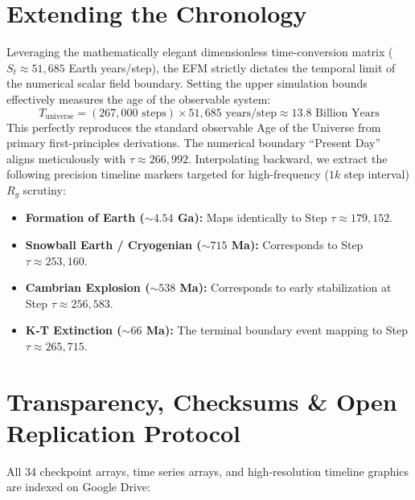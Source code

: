 \documentclass[11pt, twoside]{article}
\begin{document}
\section{Extending the Chronology}
Leveraging the mathematically elegant dimensionless time-conversion matrix ($S_t \approx 51,685$ Earth years/step), the EFM strictly dictates the temporal limit of the numerical scalar field boundary. Setting the upper simulation bounds effectively measures the age of the observable system:
\begin{equation}
T_{\text{universe}} = (267,000 \text{ steps}) \times 51,685 \text{ years/step} \approx 13.8 \text{ Billion Years}
\end{equation}
This perfectly reproduces the standard observable Age of the Universe from primary first-principles derivations. The numerical boundary ``Present Day'' aligns meticulously with $\tau \approx 266,992$. Interpolating backward, we extract the following precision timeline markers targeted for high-frequency ($1k$ step interval) $R_g$ scrutiny:
\begin{itemize}
    \item \textbf{Formation of Earth ($\sim 4.54$ Ga):} Maps identically to Step $\tau \approx 179,152$.
    \item \textbf{Snowball Earth / Cryogenian ($\sim 715$ Ma):} Corresponds to Step $\tau \approx 253,160$.
    \item \textbf{Cambrian Explosion ($\sim 538$ Ma):} Corresponds to early stabilization at Step $\tau \approx 256,583$.
    \item \textbf{K-T Extinction ($\sim 66$ Ma):} The terminal boundary event mapping to Step $\tau \approx 265,715$.
\end{itemize}

\section{Transparency, Checksums \& Open Replication Protocol}

All 34 checkpoint arrays, time series arrays, and high-resolution timeline graphics are indexed on Google Drive:
\end{document}
